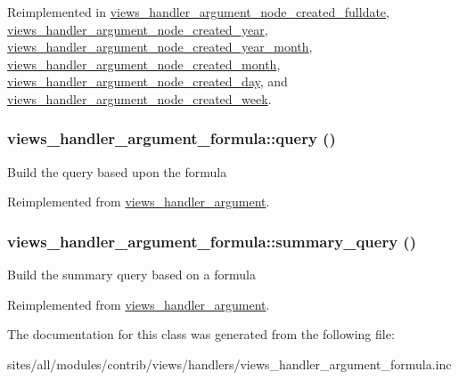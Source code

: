 Reimplemented in \hyperlink{classviews__handler__argument__node__created__fulldate_f5b74c0204c9da9285cbe3e07ebed345}{views\_\-handler\_\-argument\_\-node\_\-created\_\-fulldate}, \hyperlink{classviews__handler__argument__node__created__year_a40b34ab0d297264f7378fc995e06bc7}{views\_\-handler\_\-argument\_\-node\_\-created\_\-year}, \hyperlink{classviews__handler__argument__node__created__year__month_9e090c0caf0a169fe3f9a78160896d01}{views\_\-handler\_\-argument\_\-node\_\-created\_\-year\_\-month}, \hyperlink{classviews__handler__argument__node__created__month_0f9b4da1f37a58ca3e416667dc8d9bbb}{views\_\-handler\_\-argument\_\-node\_\-created\_\-month}, \hyperlink{classviews__handler__argument__node__created__day_eb33813a3cc0da642e45a12625da5bde}{views\_\-handler\_\-argument\_\-node\_\-created\_\-day}, and \hyperlink{classviews__handler__argument__node__created__week_e90c3f8a723cfa081198075d2fe67c52}{views\_\-handler\_\-argument\_\-node\_\-created\_\-week}.\hypertarget{classviews__handler__argument__formula_a9cb66a17cfded1800dac4c10c20f2ee}{
\subsubsection[{query}]{\setlength{\rightskip}{0pt plus 5cm}views\_\-handler\_\-argument\_\-formula::query ()}}
\label{classviews__handler__argument__formula_a9cb66a17cfded1800dac4c10c20f2ee}


Build the query based upon the formula 

Reimplemented from \hyperlink{classviews__handler__argument_c4b0ce6704a10f515b2aea2f9e790994}{views\_\-handler\_\-argument}.\hypertarget{classviews__handler__argument__formula_377fd11d178f88a0bd68c2ec9d6f9e00}{
\subsubsection[{summary\_\-query}]{\setlength{\rightskip}{0pt plus 5cm}views\_\-handler\_\-argument\_\-formula::summary\_\-query ()}}
\label{classviews__handler__argument__formula_377fd11d178f88a0bd68c2ec9d6f9e00}


Build the summary query based on a formula 

Reimplemented from \hyperlink{classviews__handler__argument_1dd6cc301b1c7c1c6829c59eb641a883}{views\_\-handler\_\-argument}.

The documentation for this class was generated from the following file:\begin{CompactItemize}
\item 
sites/all/modules/contrib/views/handlers/views\_\-handler\_\-argument\_\-formula.inc\end{CompactItemize}
